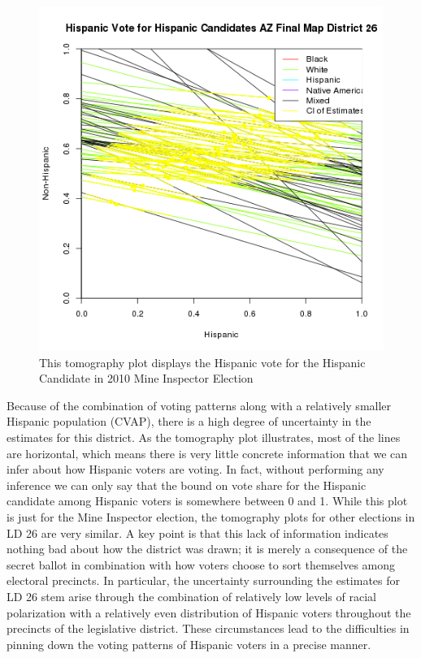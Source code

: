 \documentclass[12pt]{article}
\begin{document}
\begin{figure}[htb]
\begin{center}
\includegraphics[scale=.75]{figs/pl_hispvote_h_26_smine.png}
\caption{\label{tomog_26}This tomography plot displays the Hispanic vote for the Hispanic Candidate in 2010 Mine Inspector Election}
\end{center}
\end{figure}

Because of the combination of voting patterns along with a relatively
smaller Hispanic population (CVAP), there is a high degree of
uncertainty in the estimates for this district. As the tomography plot
illustrates, most of the lines are horizontal, which means there is
very little concrete information that we can infer about how Hispanic
voters are voting. In fact, without performing any inference we can
only say that the bound on vote share for the Hispanic candidate among
Hispanic voters is somewhere between 0 and 1. While this plot is just
for the Mine Inspector election, the tomography plots for other
elections in LD 26 are very similar.  A key point is that this lack of
information indicates nothing bad about how the district was drawn; it
is merely a consequence of the secret ballot in combination with how
voters choose to sort themselves among electoral precincts. In particular, the uncertainty
surrounding the estimates for LD 26 stem arise through the combination of relatively
low levels of racial polarization with a relatively even distribution of Hispanic voters throughout 
the precincts of the legislative district. These circumstances lead to the difficulties in pinning down
the voting patterns of Hispanic voters in a precise manner. 
\end{document}
